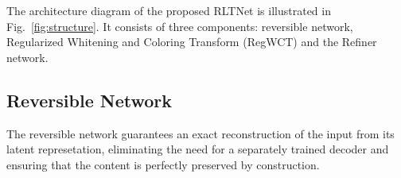 \documentclass{article}
\begin{document}






The architecture diagram of the proposed RLTNet is illustrated in Fig.~\ref{fig:structure}. It consists of three components: reversible network, Regularized Whitening and Coloring Transform (RegWCT) and the Refiner network.


\subsection{Reversible Network}
\label{sec:revnet}
The reversible network guarantees an exact reconstruction of the input from its latent represetation, eliminating the need for a separately trained decoder and ensuring that the content is perfectly preserved by construction.
\end{document}
